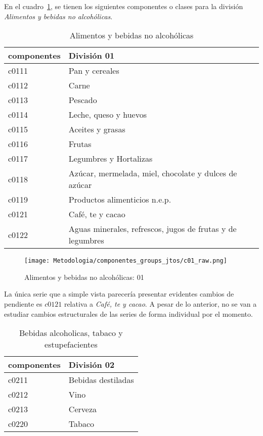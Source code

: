 \documentclass[12pt]{article}
\begin{document}
\clearpage
En el cuadro~\ref{tab:compo_01}, se tienen los siguientes componentes o clases para la división \textit{Alimentos y bebidas no alcohólicas}.

\begin{table}[h!]
\caption{Alimentos y bebidas no alcohólicas}
\label{tab:compo_01}
\begin{tabular}{l m{10cm}}
\toprule
componentes & División 01 \\
\midrule
c0111 & Pan y cereales \\
c0112 & Carne \\
c0113 & Pescado \\
c0114 & Leche, queso y huevos \\
c0115 & Aceites y grasas \\
c0116 & Frutas \\
c0117 & Legumbres y Hortalizas \\
c0118 & Azúcar, mermelada, miel, chocolate y dulces de azúcar \\
c0119 & Productos alimenticios n.e.p. \\
c0121 & Café, te y cacao \\
c0122 & Aguas minerales, refrescos, jugos de frutas y de legumbres \\
\bottomrule
\end{tabular}
\end{table}


\begin{figure}[h!]
    \caption{Alimentos y bebidas no alcohólicas: 01}
    \label{fig:c01_raw}
    \centering
    \texttt{[image: Metodologia/componentes\_groups\_jtos/c01\_raw.png]}
\end{figure}

La única serie que a simple vista parecería presentar evidentes cambios de pendiente
es $c0121$  relativa a \textit{Café, te y cacao}. A pesar de lo anterior, no se van a estudiar cambios estructurales de las series de forma individual por el momento.




\clearpage
\begin{table}[h!]
\caption{Bebidas alcoholicas, tabaco y estupefacientes}
\label{tab:compo_02}
\begin{tabular}{l m{10cm}}
\toprule
componentes & División 02 \\
\midrule
c0211 & Bebidas destiladas \\
c0212 & Vino \\
c0213 & Cerveza \\
c0220 & Tabaco \\
\bottomrule
\end{tabular}
\end{table}
\end{document}
